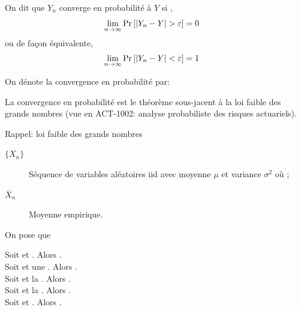\documentclass[french]{article}
\begin{document}
\begin{multicols*}{2}
\begin{definitionNOHFILL}
On dit que $Y_{n}$ converge en probabilité à $Y$ si , 
\begin{align*}
	\underset{n \rightarrow \infty}{\lim} \Pr\left[|Y_{n}	-	Y|	>	\varepsilon\right]	
	&=	0
\end{align*}
ou de façon équivalente,
\begin{align*}
	\underset{n \rightarrow \infty}{\lim} \Pr\left[|Y_{n}	-	Y|<	\varepsilon\right]	
	&=	1
\end{align*}

On dénote la convergence en probabilité par: 
\end{definitionNOHFILL}

La convergence en probabilité est le théorème sous-jacent à la loi faible des grands nombres (vue en ACT-1002: analyse probabiliste des risques actuariels).

\begin{rappel}{Rappel: loi faible des grands nombres}
\begin{distributions}[Notation]
\begin{description}
	\item[$\{X_{n}\}$]	Séquence de variables aléatoires iid avec moyenne $\mu$ et variance $\sigma^{2}$ où ;
	\item[$\overline{X}_{n}$]	Moyenne empirique.
\end{description}
\end{distributions}

On pose que 
\end{rappel}

\begin{definitionNOHFILLprop}
Soit  et . Alors .\\
Soit  et une . Alors .\\
Soit  et la . Alors .\\
Soit  et la . Alors .\\
Soit  et . Alors .
\end{definitionNOHFILLprop}



\end{multicols*}
\end{document}
